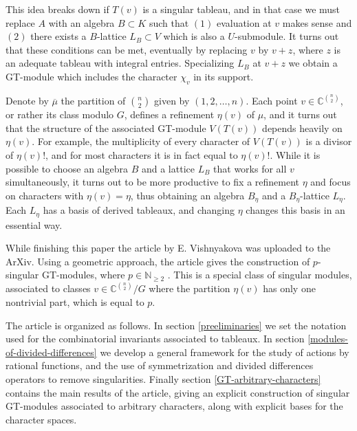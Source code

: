 \documentclass[11pt,fleqn]{article}
\newcommand\NN{\mathbb N}
\newcommand\CC{\mathbb C}
\begin{document}
This idea breaks down if $T(v)$ is a singular tableau, and in that case we must
replace $A$ with an algebra $B \subset K$ such that $(1)$ evaluation at $v$ 
makes sense and $(2)$ there exists a $B$-lattice $L_B \subset V$ which is also
a $U$-submodule. It turns out that these conditions can be met, eventually by
replacing $v$ by $v+z$, where $z$ is an adequate tableau with integral 
entries. Specializing $L_B$ at $v+z$ we obtain a GT-module which includes 
the character $\chi_v$ in its support.

Denote by $\overline \mu$ the partition of $\binom{n}{2}$ given by 
$(1,2,\ldots, n)$. Each point $v \in \CC^{\binom{n}{2}}$, or rather its class 
modulo $G$, defines a refinement $\eta(v)$ of $\mu$, and it turns out that the 
structure of the associated GT-module $V(T(v))$ depends heavily on $\eta(v)$. 
For example, the multiplicity of every character of $V(T(v))$ is a divisor of 
$\eta(v)!$, and for most characters it is in fact equal to $\eta(v)!$. While 
it is possible to choose an algebra $B$ and a lattice $L_B$ that works for all 
$v$ simultaneously, it turns out to be more productive to fix a refinement 
$\eta$ and focus on characters with $\eta(v) = \eta$, thus obtaining an algebra
$B_\eta$ and a $B_\eta$-lattice $L_\eta$. Each $L_\eta$ has a basis of derived
tableaux, and changing $\eta$ changes this basis in an essential way.

While finishing this paper the article \cite{V-geometric-singular-GT} by 
E. Vishnyakova was uploaded to the ArXiv. Using a geometric approach, the article gives the construction 
of $p$-singular GT-modules, where $p \in \NN_{\geq 2}$ . This is a special 
class of singular modules, associated to classes $v \in \CC^{\binom{n}{2}}
/G$ where the partition $\eta(v)$ has only one nontrivial part, which is equal 
to $p$.
\bigskip

The article is organized as follows. In section \ref{preeliminaries} we 
set the notation used for the combinatorial invariants associated to tableaux.
In section \ref{modules-of-divided-differences} we develop a general framework 
for the study of actions by rational functions, and the use of symmetrization 
and divided differences operators to remove singularities. Finally section 
\ref{GT-arbitrary-characters} contains the main results of the article, giving
an explicit construction of singular GT-modules associated to arbitrary 
characters, along with explicit bases for the character spaces. 







\end{document}
